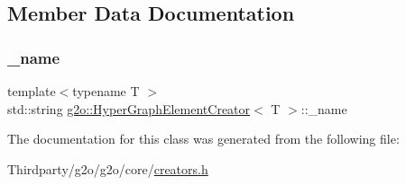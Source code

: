 \subsection{Member Data Documentation}
\mbox{\label{classg2o_1_1_hyper_graph_element_creator_abbcc42de74a57d80b586dd843255ebae}} 
\subsubsection{\texorpdfstring{\+\_\+name}{\_name}}
{\footnotesize\ttfamily template$<$typename T $>$ \\
std\+::string \mbox{\hyperlink{classg2o_1_1_hyper_graph_element_creator}{g2o\+::\+Hyper\+Graph\+Element\+Creator}}$<$ T $>$\+::\+\_\+name\hspace{0.3cm}{\ttfamily [protected]}}



The documentation for this class was generated from the following file\+:\begin{DoxyCompactItemize}
\item 
Thirdparty/g2o/g2o/core/\mbox{\hyperlink{creators_8h}{creators.\+h}}\end{DoxyCompactItemize}
